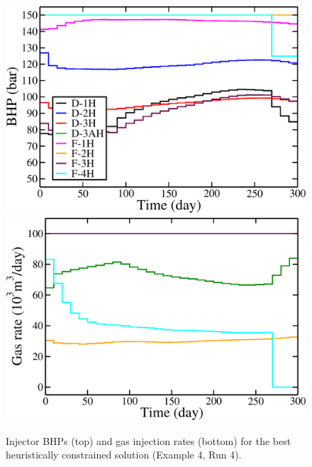 \documentclass[twocolumn,numbook]{svjour3}          %
\begin{document}
\begin{figure}
\begin{center}
\includegraphics[totalheight=2.2in,angle=0]{norneOptimalChoppedImPbT300_BHP.pdf}
\includegraphics[totalheight=2.2in,angle=0]{norneOptimalChoppedImPbT300_rate_gas.pdf}
\end{center}
\caption{Injector BHPs (top) and gas injection rates (bottom) for the best heuristically constrained solution (Example 4, Run 4).}
\label{fig:NorneUnconstrainedOptimalChoppedRates}
\end{figure}
\end{document}
